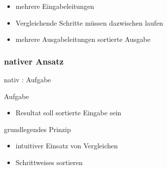 \documentclass[ucs,9pt]{beamer}
\begin{document}
\begin{frame}
    \begin{itemize}
        \item mehrere Eingabeleitungen
        \item Vergleichende Schritte müssen dazwischen laufen
        \item mehrere Ausgabeleitungen sortierte Ausgabe
    \end{itemize}
\end{frame}

\subsubsection*{nativer Ansatz}
\begin{frame}{nativ : Aufgabe}
\begin{semiverbatim}
     {Aufgabe
        \begin{itemize}
            \item Resultat soll sortierte Eingabe sein
            \end{itemize}}
     {\item grundlegendes Prinzip
        \begin{itemize}
            \item intuitiver Einsatz von Vergleichen
            \item Schrittweises sortieren
        \end{itemize}}
\end{semiverbatim}
\end{frame}
\end{document}
